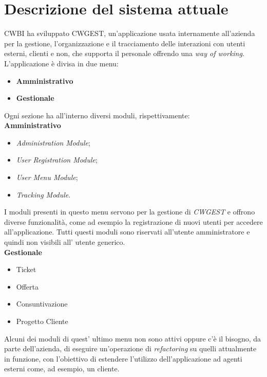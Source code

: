 \chapter{Descrizione del sistema attuale}
CWBI ha sviluppato CWGEST\glsfirstoccur , un'applicazione usata internamente all'azienda per la gestione, l'organizzazione e il tracciamento delle interazioni con utenti esterni, clienti e non, che supporta il personale offrendo una \textit{way of working}. \\
L'applicazione è divisa in due menu:
\begin{itemize}
	\item \textbf{Amministrativo}
	\item \textbf{Gestionale}
\end{itemize}
Ogni sezione ha all'interno diversi moduli, rispettivamente:\\
\textbf{Amministrativo}
\begin{itemize}
\item \textit{Administration Module};
\item \textit{User Registration Module};
\item \textit{User Menu Module};
\item \textit{Tracking Module}.
\end{itemize}
I moduli presenti in questo menu servono per la gestione di \textit{CWGEST} e offrono diverse funzionalità, come ad esempio la registrazione di nuovi utenti per accedere all'applicazione. Tutti questi moduli sono riservati all'utente amministratore e quindi non visibili all' utente generico. \\
\textbf{Gestionale}
\begin{itemize}
\item Ticket 
\item Offerta
\item Consuntivazione
\item Progetto Cliente
\end{itemize}
Alcuni dei moduli di quest' ultimo menu non sono attivi oppure c'è il bisogno, da parte dell'azienda, di eseguire un'operazione di \textit{refactoring\glsfirstoccur}\; su quelli attualmente in funzione, con l'obiettivo di estendere l'utilizzo dell'applicazione ad agenti esterni come, ad esempio, un cliente. 

